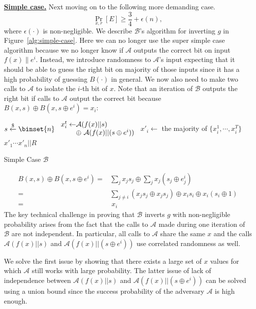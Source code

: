 \documentclass[12pt]{tufte-book}
\newcommand{\ma}{\mathcal{A}}
\begin{document}
\bigskip
\noindent\textbf{\underline{Simple case.}}
Next moving on to the following more demanding case.
$$\Pr_{x,r}[E] \geq \frac{3}{4} + \epsilon(n),$$ where $\epsilon(\cdot)$ is non-negligible.
We describe $\mathcal{B}$'s algorithm for inverting $g$ in Figure~\ref{alg:simple-case}.
Here we can no longer use the super simple case algorithm because we no longer know if $\ma$ outputs the correct bit on input $f(x) \| e^i$.
Instead, we introduce randomness to $\ma$'s input expecting that it should be able to guess the right bit on majority of those inputs since it has a high probability of guessing $B(\cdot)$ in general.
We now also need to make two calls to $\ma$ to isolate the $i$-th bit of $x$.
Note that an iteration of $\mathcal{B}$ outputs the right bit if calls to $\ma$ output the correct bit because $B(x,s) \oplus B(x, s\oplus e^i) = x_i$:
\begin{marginfigure}
\begin{algorithmic}
		\State $s \stackrel{\$}{\leftarrow} \binset{n}$
\State $\begin{array}{l@{}l}
		x_i^t \leftarrow& \ma(f(x)|| s) \\
		& \oplus~ \ma(f(x) || (s\oplus e^i))
		\end{array}$
	\EndFor
	\State $x'_i \gets $ the majority of $\{x_i^1, \cdots, x_i^T\}$
\EndFor
\State \Return $x'_1\cdots x'_n||R$
\end{algorithmic}
\caption{Simple Case $\mathcal{B}$} \label{alg:simple-case}
\end{marginfigure}
\begin{align*}
B(x,s) \oplus B(x, s\oplus e^i) =& \sum_j x_j s_j \oplus \sum_j x_j (s_j \oplus e^i_j)\\
=& \sum_{j \not= i} (x_j s_j \oplus x_j s_j) \oplus x_i s_i \oplus x_i (s_i \oplus 1)\\
=& ~x_i
\end{align*}
The key technical challenge in proving that $\mathcal{B}$ inverts $g$ with non-negligible probability arises from the fact that the calls to $\ma$ made during one iteration of $\mathcal{B}$ are not independent.
In particular, all calls to $\ma$ share the same $x$ and the calls $\ma(f(x)|| s)$ and $\ma(f(x) || (s \oplus e^i))$ use correlated randomness as well.

We solve the first issue by showing that there exists a large set of $x$ values for which $\ma$ still works with large probability.
The latter issue of lack of independence between $\ma(f(x)|| s)$ and $\ma(f(x) || (s \oplus e^i))$ can be solved using a union bound since the success probability of the adversary $\ma$ is high enough.
\end{document}
